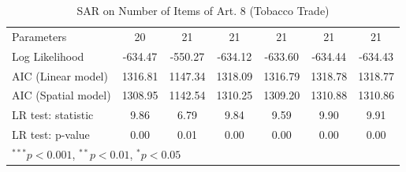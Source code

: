 \begin{table}[!h]
\begin{center}
\begin{tabular}{l c c c c c c }
Parameters              & 20           & 21           & 21           & 21           & 21           & 21           \\
Log Likelihood          & -634.47      & -550.27      & -634.12      & -633.60      & -634.44      & -634.43      \\
AIC (Linear model)      & 1316.81      & 1147.34      & 1318.09      & 1316.79      & 1318.78      & 1318.77      \\
AIC (Spatial model)     & 1308.95      & 1142.54      & 1310.25      & 1309.20      & 1310.88      & 1310.86      \\
LR test: statistic      & 9.86         & 6.79         & 9.84         & 9.59         & 9.90         & 9.91         \\
LR test: p-value        & 0.00         & 0.01         & 0.00         & 0.00         & 0.00         & 0.00         \\
\bottomrule
\multicolumn{7}{l}{\scriptsize{$^{***}p<0.001$, $^{**}p<0.01$, $^*p<0.05$}}
\end{tabular}
\caption{SAR on Number of Items of Art. 8 (Tobacco Trade)}
\label{table:coefficients}
\end{center}
\end{table}
